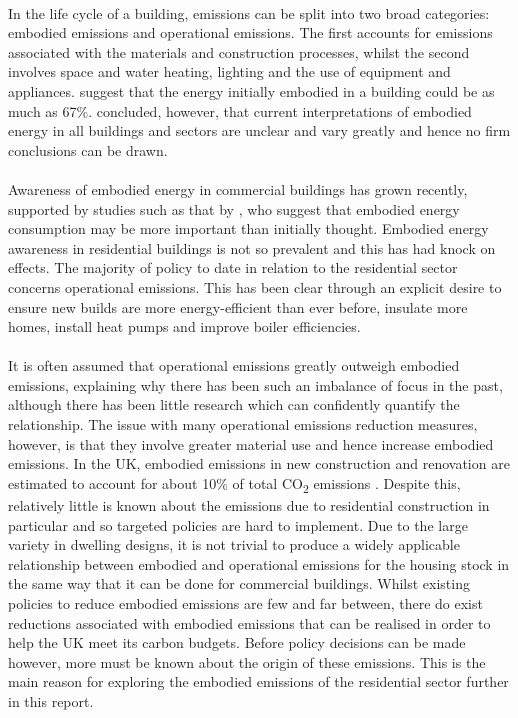 \documentclass[12pt]{article}
\begin{document}
\paragraph{}
In the life cycle of a building, emissions can be split into two broad categories: embodied emissions and operational emissions. The first accounts for emissions associated with the materials and construction processes, whilst the second involves space and water heating, lighting and the use of equipment and appliances. \citet{Yohanis2002-vh} suggest that the energy initially embodied in a building could be as much as 67\%. \citet{Dixit2012-hx} concluded, however, that current interpretations of embodied energy in all buildings and sectors are unclear and vary greatly and hence no firm conclusions can be drawn.

\paragraph{}
Awareness of embodied energy in commercial buildings has grown recently, supported by studies such as that by \citet{Troy2003-rf}, who suggest that embodied energy consumption may be more important than initially thought. Embodied energy awareness in residential buildings is not so prevalent and this has had knock on effects. The majority of policy to date in relation to the residential sector concerns operational emissions. This has been clear through an explicit desire to ensure new builds are more energy-efficient than ever before, insulate more homes, install heat pumps and improve boiler efficiencies.

\paragraph{}
It is often assumed that operational emissions greatly outweigh embodied emissions, explaining why there has been such an imbalance of focus in the past, although there has been little research which can confidently quantify the relationship. The issue with many operational emissions reduction measures, however, is that they involve greater material use and hence increase embodied emissions. In the UK, embodied emissions in new construction and renovation are estimated to account for about 10\% of total CO\textsubscript{2} emissions \citep{Designing_Buildings_Wiki_undated-kh}. Despite this, relatively little is known about the emissions due to residential construction in particular and so targeted policies are hard to implement. Due to the large variety in dwelling designs, it is not trivial to produce a widely applicable relationship between embodied and operational emissions for the housing stock in the same way that it can be done for commercial buildings. Whilst existing policies to reduce embodied emissions are few and far between, there do exist reductions associated with embodied emissions that can be realised in order to help the UK meet its carbon budgets. Before policy decisions can be made however, more must be known about the origin of these emissions. This is the main reason for exploring the embodied emissions of the residential sector further in this report. 
\end{document}
